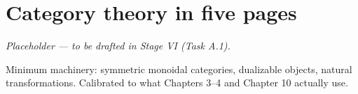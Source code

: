 \chapter{Category theory in five pages}\label{app:category}

\emph{Placeholder --- to be drafted in Stage VI (Task A.1).}

Minimum machinery: symmetric monoidal categories, dualizable objects, natural transformations. Calibrated to what Chapters 3--4 and Chapter 10 actually use.
